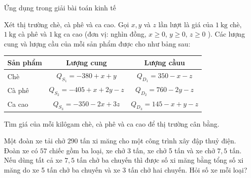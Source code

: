 \begin{bt}
\begin{dang}{Ứng dụng trong giải bài toán kinh tế}
	\end{dang}
\begin{vd}%
	Xét thị trường chè, cà phê và ca cao. Gọi $x, y$ và $z$ lần lượt là giá của $1 \mathrm{~kg}$ chè, $1 \mathrm{~kg}$ cà phê và $1 \mathrm{~kg}$ ca cao (đơn vị: nghìn đồng, $x \geq 0$, $y \geq 0$, $z \geq 0$ ). Các lượng cung và lượng cầu của mỗi sản phẩm được cho như bảng sau:\begin{center}
	\begin{tabular}{|l|c|c|}
		\hline \multicolumn{1}{|c|}{ Sản phẩm } & Lượng cung & Lượng cầuu \\
		\hline Chè & $Q_{S_1}=-380+x+y$ & $Q_{D_1}=350-x-z$ \\
		\hline Cà phê & $Q_{S_2}=-405+x+2 y-z$ & $Q_{D_2}=760-2 y-z$ \\
		\hline Ca cao & $Q_{S_3}=-350-2 x+3 z$ & $Q_{D_3}=145-x+y-z$ \\
		\hline
	\end{tabular}
\end{center}
	Tìm giá của mỗi kilôgam chè, cà phê và ca cao để thị trường cân bằng.
	\end{vd}
\begin{vd}%
	Một đoàn xe tải chở $290$ tấn xi măng cho một công trình xây đập thuỷ điện. Đoàn xe có $57$ chiếc gồm ba loại, xe chở 3 tấn, xe chở 5 tấn và xe chở $7{,}5$ tấn. Nếu dùng tất cả xe $7{,}5$ tấn chở ba chuyến thì được số xi măng bằng tổng số xi măng do xe 5 tấn chở ba chuyến và xe 3 tấn chở hai chuyến. Hỏi số xe mỗi loại?
\end{vd}

\end{bt}
